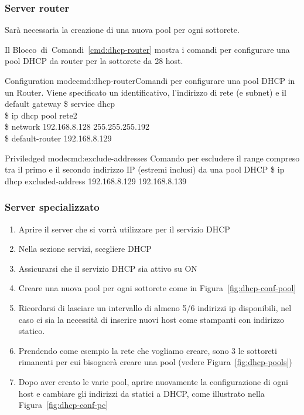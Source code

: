 \subsubsection{Server router}
Sarà necessaria la creazione di una nuova pool per ogni sottorete.

Il Blocco~di~Comandi~\ref{cmd:dhcp-router} mostra i comandi per configurare una pool DHCP da router per la sottorete da 28 host.

\begin{cmds}[Router]{Configuration mode}{cmd:dhcp-router}{Comandi per configurare una pool DHCP in un Router. Viene specificato un \textcolor{Highlight1}{identificativo}, \textcolor{Highlight2}{l'indirizzo di rete (e subnet)} e \textcolor{Highlight3}{il default gateway}}
    \$ service dhcp\\
    \$ ip dhcp pool \textcolor{Highlight1}{rete2}\\
    \$ network \textcolor{Highlight2}{192.168.8.128 255.255.255.192}\\
    \$ default-router \textcolor{Highlight3}{192.168.8.129}
\end{cmds}

\begin{cmds}[Router]{Priviledged mode}{cmd:exclude-addresses}{
    Comando per escludere il range compreso tra \textcolor{Highlight1}{il primo} e \textcolor{Highlight2}{il secondo} indirizzo IP (estremi inclusi) da una pool DHCP
}
    \$ ip dhcp excluded-address \textcolor{Highlight1}{192.168.8.129} \textcolor{Highlight2}{192.168.8.139}
\end{cmds}


\subsubsection{Server specializzato}
\begin{enumerate}
    \item Aprire il server che si vorrà utilizzare per il servizio DHCP
    \item Nella sezione servizi, scegliere DHCP
    \item Assicurarsi che il servizio DHCP sia attivo su ON
    \item Creare una nuova pool per ogni sottorete come in Figura~\ref{fig:dhcp-conf-pool}
    \item Ricordarsi di lasciare un intervallo di almeno 5/6 indirizzi ip disponibili, nel caso ci sia la necessità di inserire nuovi host come stampanti con indirizzo statico.
    \item Prendendo come esempio la rete che vogliamo creare, sono 3 le sottoreti rimanenti per cui bisognerà creare una pool (vedere Figura~\ref{fig:dhcp-pools})
    \item Dopo aver creato le varie pool, aprire nuovamente la configurazione di ogni host e cambiare gli indirizzi da statici a DHCP, come illustrato nella Figura~\ref{fig:dhcp-conf-pc}
\end{enumerate}

